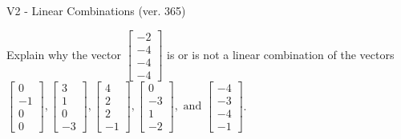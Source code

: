 \begin{exercise}
  \begin{exerciseTitle}V2 - Linear Combinations (ver. 365)\end{exerciseTitle}
  \begin{exerciseStatement}
    Explain why the vector \(\left[\begin{array}{c}
-2 \\
-4 \\
-4 \\
-4
\end{array}\right]\)  is or is not a linear 
	combination of the vectors \(\left[\begin{array}{c}
0 \\
-1 \\
0 \\
0
\end{array}\right] , \left[\begin{array}{c}
3 \\
1 \\
0 \\
-3
\end{array}\right] , \left[\begin{array}{c}
4 \\
2 \\
2 \\
-1
\end{array}\right] , \left[\begin{array}{c}
0 \\
-3 \\
1 \\
-2
\end{array}\right] , \text{ and } \left[\begin{array}{c}
-4 \\
-3 \\
-4 \\
-1
\end{array}\right]\).
	



\end{exerciseStatement}
\end{exercise}
